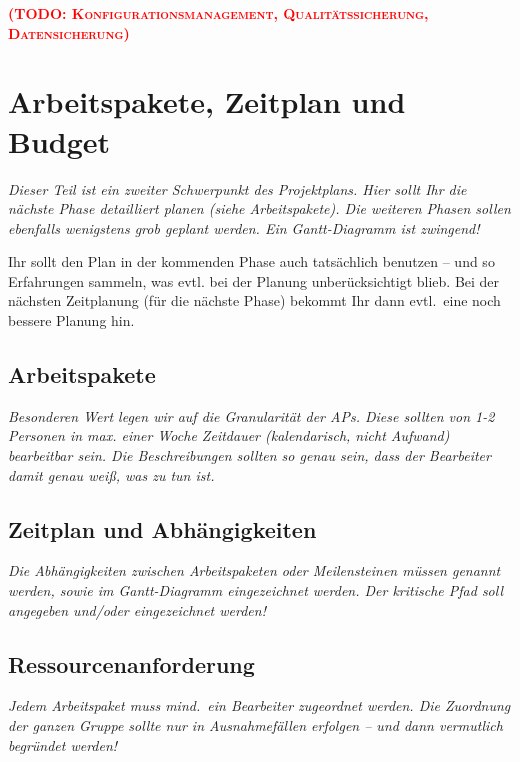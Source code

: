 \documentclass[fontsize=12pt,paper=a4,twoside]{scrartcl}
\newcommand{\todo}[1]{\textbf{\textsc{\textcolor{red}{(TODO: #1)}}}}
\begin{document}

\todo{Konfigurationsmanagement, Qualitätssicherung, Datensicherung}


\section{Arbeitspakete, Zeitplan und Budget}

{\em Dieser Teil ist ein zweiter Schwerpunkt des Projektplans. Hier sollt Ihr die nächste Phase detailliert planen (siehe Arbeitspakete). Die weiteren Phasen sollen ebenfalls wenigstens grob geplant werden. Ein Gantt-Diagramm ist zwingend! 

Ihr sollt den Plan in der kommenden Phase auch tatsächlich benutzen -- und so
  Erfahrungen sammeln, was evtl. bei der Planung unberücksichtigt
  blieb. Bei der nächsten Zeitplanung (für die nächste Phase) bekommt
  Ihr dann evtl.\ eine noch bessere Planung hin.}

\subsection{Arbeitspakete}\label{aps}


{\em Besonderen Wert legen wir auf die Granularität der APs. Diese
  sollten von 1-2 Personen in max. einer Woche Zeitdauer (kalendarisch, nicht
  Aufwand) bearbeitbar sein. Die Beschreibungen sollten so genau sein,
  dass der Bearbeiter damit genau weiß, was zu tun ist.}

\subsection{Zeitplan und Abhängigkeiten}

{\em Die Abhängigkeiten zwischen Arbeitspaketen oder Meilensteinen müssen genannt werden, sowie im
  Gantt-Diagramm eingezeichnet werden. Der kritische Pfad soll
  angegeben und/oder eingezeichnet werden!}

\subsection{Ressourcenanforderung}

{\em Jedem Arbeitspaket muss mind.\ ein Bearbeiter zugeordnet
  werden. Die Zuordnung der ganzen Gruppe sollte nur in Ausnahmefällen
  erfolgen -- und dann vermutlich begründet werden!}
\end{document}
